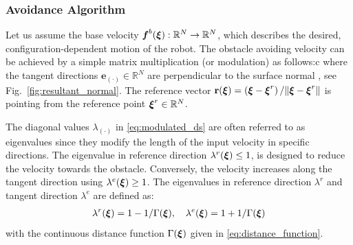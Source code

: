 \subsubsection{Avoidance Algorithm}
Let us assume the base velocity $\boldsymbol{f}^b(\boldsymbol{\xi}): \mathbb{R}^N \rightarrow \mathbb{R}^N$, which describes the desired, configuration-dependent motion of the robot. 
The obstacle avoiding velocity  can be achieved by a simple matrix multiplication (or modulation) as follows:c
where the tangent directions $\textbf{e}_{(\cdot)} \in \mathbb{R}^N$ are perpendicular to the surface normal , see Fig.~\ref{fig:resultant_normal}. The reference vector $\textbf{r}(\boldsymbol{\xi}) =  \left( \boldsymbol{\xi}-\boldsymbol{\xi}^r \right) / \| \boldsymbol{\xi}-\boldsymbol{\xi} ^r \|$ is pointing  from the reference point $\boldsymbol{\xi}^r \in \mathbb{R}^N$. 

The diagonal values $\lambda_{(\cdot)}$ in \eqref{eq:modulated_ds} are often referred to as eigenvalues since they modify the length of the input velocity in specific directions. 
The eigenvalue in reference direction $\lambda^r(\boldsymbol{\xi}) \leq 1$, is designed to reduce the velocity towards the obstacle.  
Conversely, the velocity increases along the tangent direction using $\lambda^e(\boldsymbol{\xi}) \geq 1$. The eigenvalues in reference direction $\lambda^r$ and tangent direction $\lambda^e$ are defined as:
\begin{equation}
\begin{split}
    \lambda^r(\boldsymbol{\xi}) = 1 - 1 /\Gamma(\boldsymbol{\xi}) , \quad \lambda^e(\boldsymbol{\xi}) = 1 + 1 / \Gamma(\boldsymbol{\xi})
    \label{eq:eigenvalues}
    \end{split}
\end{equation}
with the continuous distance function $\Gamma(\boldsymbol{\xi})$ given in \eqref{eq:distance_function}.


